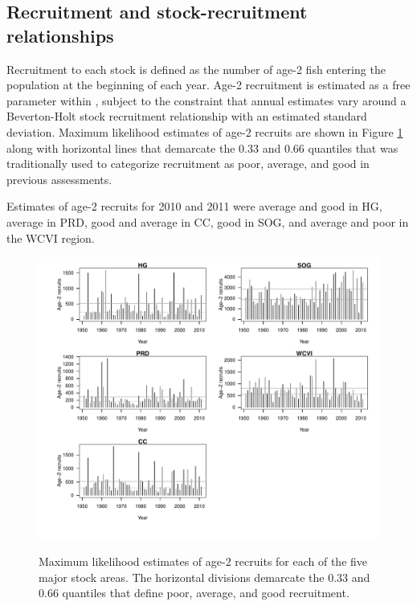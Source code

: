 \subsection{Recruitment and stock-recruitment relationships}

Recruitment to each stock is defined as the number of age-2 fish entering the population at the beginning of each year. Age-2 recruitment is estimated as a free parameter within \iscam, subject to the constraint that annual estimates vary around a Beverton-Holt stock recruitment relationship with an estimated standard deviation.  Maximum likelihood estimates of age-2 recruits are shown in Figure \ref{PartII:Results:FigAge2Recruits} along with horizontal lines that demarcate the 0.33 and 0.66 quantiles that was traditionally used to categorize recruitment as poor, average, and good in previous assessments.

Estimates of age-2 recruits for 2010 and 2011 were average and good  in HG, average in PRD, good and average in CC, good in SOG, and average and poor in the WCVI region.


\begin{figure}[!tbp]
	\includegraphics[width=\textwidth]{../FIGS/qPriorFigs/iscam_fig_recruitment.pdf}\\
	\caption{Maximum likelihood estimates of age-2 recruits for each of the five major stock areas.  The horizontal divisions demarcate the 0.33 and 0.66 quantiles that define poor, average, and good recruitment.}\label{PartII:Results:FigAge2Recruits}
\end{figure}

